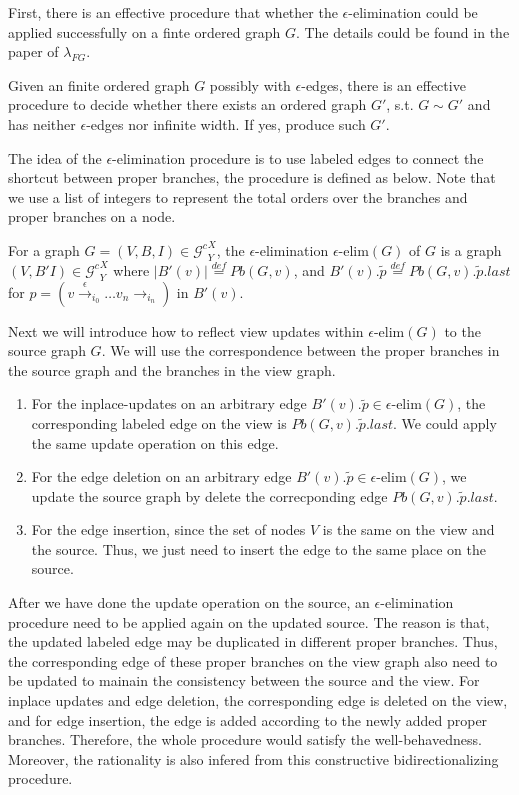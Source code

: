 \documentclass{llncs}
\newcommand{\act}[1]{{\xrightarrow{#1}{}}}
\newcommand{\Gc}{{\mathcal{G}^{c}}}
\begin{document}
First, there is an effective procedure that whether the $\epsilon$-elimination could be applied successfully on a finte ordered graph $G$. The details could be found in the paper of $\lambda_{FG}$.

\begin{lemma}\label{lamma:eps-exists}
Given an finite ordered graph $G$ possibly with $\epsilon$-edges, there is an effective procedure to decide whether there exists an ordered graph $G'$, s.t. $G\sim G'$ and has neither $\epsilon$-edges nor infinite width. If yes, produce such $G'$.
\end{lemma}

The idea of the $\epsilon$-elimination procedure is to use labeled edges to connect the shortcut between proper branches, the procedure is defined as below. Note that we use a list of integers to represent the total orders over the branches and proper branches on a node.

\begin{definition}\label{def:epsilon}
For a graph $G=(V,B,I)\in\Gc^X_Y$, the $\epsilon$-elimination $\epsilon\mbox{-elim}(G)$ of $G$ is a graph $(V,B'I)\in\Gc^X_Y$ where $|B'(v)|\stackrel{def}{=}Pb(G,v)$, and $B'(v).\tilde{p}\stackrel{def}{=}Pb(G,v).\tilde{p}.last$ for $p=(v\act{\epsilon}_{i_0}\ldots v_n\act{}_{i_n})$ in $B'(v)$.
\end{definition}

Next we will introduce how to reflect view updates within $\epsilon\mbox{-elim}(G)$ to the source graph $G$. We will use the correspondence between the proper branches in the source graph and the branches in the view graph.

\begin{enumerate}
	\item For the inplace-updates on an arbitrary edge $B'(v).\tilde{p}\in\epsilon\mbox{-elim}(G)$, the corresponding labeled edge on the view is $Pb(G,v).\tilde{p}.last$. We could apply the same update operation on this edge. 
	\item For the edge deletion on an arbitrary edge $B'(v).\tilde{p}\in\epsilon\mbox{-elim}(G)$, we update the source graph by delete the correcponding edge $Pb(G,v).\tilde{p}.last$.
	\item For the edge insertion, since the set of nodes $V$ is the same on the view and the source. Thus, we just need to insert the edge to the same place on the source.
\end{enumerate}

After we have done the update operation on the source, an $\epsilon$-elimination procedure need to be applied again on the updated source. The reason is that, the updated labeled edge may be duplicated in different proper branches. Thus, the corresponding edge of these proper branches on the view graph also need to be updated to mainain the consistency between the source and the view. For inplace updates and edge deletion, the corresponding edge is deleted on the view, and for edge insertion, the edge is added according to the newly added proper branches. Therefore, the whole procedure would satisfy the well-behavedness. Moreover, the rationality is also infered from this constructive bidirectionalizing procedure.
\end{document}
